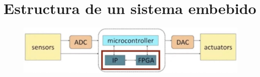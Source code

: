 \documentclass[12pt, twoside, openright]{report} %
\begin{document}
\section{Estructura de un sistema embebido}

\begin{figure}[H]
	{\includegraphics[scale=.35]{2021-03-19 16_58_28-DSO Elementos Sistema embebido.mkv.png}}
\end{figure}
\end{document}
